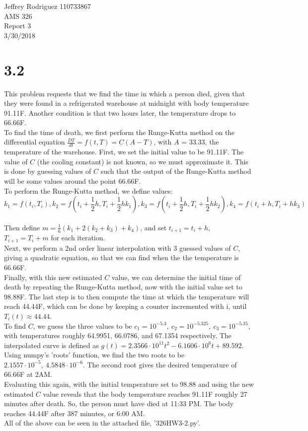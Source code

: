 \documentclass[12pt]{article}
\begin{document}
\begin{center}
Jeffrey Rodriguez 110733867\\AMS 326\\Report 3\\3/30/2018\\

\end{center}

\section*{3.2}
This problem requests that we find the time in which a person died, given that they were found in a refrigerated warehouse at midnight with body temperature 91.11F. Another condition is that two hours later, the temperature drops to 66.66F. 
\\To find the time of death, we first perform the Runge-Kutta method on the differential equation 
$\frac{DT}{dt} = f(t,T) = C(A-T)$, with $A$ = 33.33, the temperature of the warehouse. First, we set the initial value to be 91.11F. The value of $C$ (the cooling constant) is not known, so we must approximate it. This is done by guessing values of $C$ such that the output of the Runge-Kutta method will be some values around the point 66.66F. 
\\To perform the Runge-Kutta method, we define values: $$k_1 = f(t_i,T_i),k_2 = f(t_i + \frac{1}{2}h, T_i + \frac{1}{2}h k_1), k_3 = f(t_i + \frac{1}{2}h, T_i + \frac{1}{2}h k_2), k_4 = f(t_i + h,T_i + h k_3)$$
\\Then define $m = \frac{1}{6}(k_1 + 2(k_2+k_3) + k_4)$, and set $t_{i+1} = t_i + h$, $T_{i+1} = T_i + m$ for each iteration.
\\Next, we perform a 2nd order linear interpolation with 3 guessed values of $C$, giving a quadratic equation, so that we can find when the the temperature is 66.66F.
\\Finally, with this new estimated $C$ value, we can determine the initial time of death by repeating the Runge-Kutta method, now with the initial value set to 98.88F. The last step is to then compute the time at which the temperature will reach 44.44F, which can be done by keeping a counter incremented with i, until $T_i(t) \approx 44.44$.
\\To find $C$, we guess the three values to be $c_1 = 10^{-5.3},~c_2 = 10^{-5.325},~c_3=10^{-5.35}$, with temperatures roughly 64.9951, 66.0786, and 67.1354 respectively. 
The interpolated curve is defined as $g(t) = 2.3566\cdot10^{11}t^2 - 6.1606\cdot10^6 t + 89.592$. Using numpy's 'roots' function, we find the two roots to be $2.1557\cdot10^{-5},~4.5848\cdot 10^{-6}$. The second root gives the desired temperature of 66.66F at 2AM.
\\Evaluating this again, with the initial temperature set to 98.88 and using the new estimated $C$ value reveals that the body temperature reaches 91.11F roughly 27 minutes after death. So, the person must have died at 11:33 PM. The body reaches 44.44F after 387 minutes, or 6:00 AM.
\\All of the above can be seen in the attached file, '326HW3-2.py'.
\end{document}
